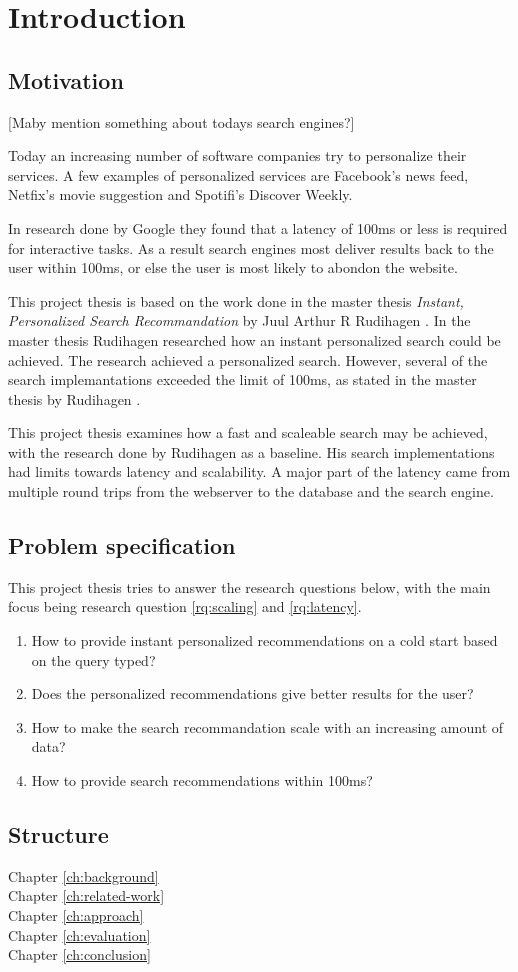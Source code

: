 \chapter{Introduction}
\section{Motivation}
[Maby mention something about todays search engines?]

Today an increasing number of software companies try to personalize their services.
A few examples of personalized services are Facebook's news feed, Netfix's movie suggestion and Spotifi's Discover Weekly.

In research done by Google \cite{google-latency} they found that a latency of 100ms or less is required for interactive tasks.
As a result search engines most deliver results back to the user within 100ms, or else the user is most likely to abondon the website.

This project thesis is based on the work done in the master thesis \textit{Instant, Personalized Search Recommandation} by Juul Arthur R Rudihagen \cite{master-thesis}.
In the master thesis Rudihagen researched how an instant personalized search could be achieved.
The research achieved a personalized search.
However, several of the search implemantations exceeded the limit of 100ms, as stated in the master thesis by Rudihagen \cite[sec 6.6]{master-thesis}.

This project thesis examines how a fast and scaleable search may be achieved, with the research done by Rudihagen as a baseline.
His search implementations had limits towards latency and scalability.
A major part of the latency came from multiple round trips from the webserver to the database and the search engine.

\section{Problem specification}
This project thesis tries to answer the research questions below, with the main focus being research question \ref{rq:scaling} and \ref{rq:latency}.

\begin{enumerate}
  \item How to provide instant personalized recommendations on a cold start based on the query typed?
  \item Does the personalized recommendations give better results for the user?
  \item\label{rq:scaling} How to make the search recommandation scale with an increasing amount of data?
  \item\label{rq:latency} How to provide search recommendations within 100ms?
\end{enumerate}

\section{Structure}
Chapter \ref{ch:background} \\
Chapter \ref{ch:related-work} \\
Chapter \ref{ch:approach} \\
Chapter \ref{ch:evaluation} \\
Chapter \ref{ch:conclusion}
